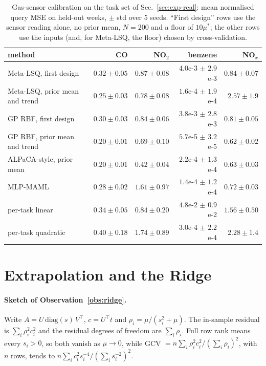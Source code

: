 \documentclass[fullpaper,final]{nldl}
\theoremstyle{plain}
\theoremstyle{definition}
\begin{document}
\begin{table}[tb]
\centering
\caption{Gas-sensor calibration on the task set of Sec.~\ref{sec:exp-real}: mean
normalised query MSE on held-out weeks, $\pm$ std over 5 seeds. ``First design''
rows use the sensor reading alone, no prior mean, $N{=}200$ and a floor of
$10\mu^\ast$; the
other rows use the inputs (and, for Meta-LSQ, the floor) chosen by cross-validation.}
\label{tab:realv2}
\footnotesize
\setlength{\tabcolsep}{5pt}
\begin{tabular}{lrrrr}
\toprule
method & CO & NO$_2$ & benzene & NO$_x$ \\
\midrule
Meta-LSQ, first design            & $0.32 \pm 0.05$ & $0.87 \pm 0.08$ & $4.0$e-3 $\pm$ $2.9$e-3 & $0.84 \pm 0.07$ \\
Meta-LSQ, prior mean and trend    & $0.25 \pm 0.03$ & $0.78 \pm 0.08$ & $1.6$e-4 $\pm$ $1.9$e-4 & $2.57 \pm 1.9$ \\
GP RBF, first design              & $0.30 \pm 0.03$ & $0.84 \pm 0.06$ & $3.8$e-3 $\pm$ $2.8$e-3 & $0.81 \pm 0.05$ \\
GP RBF, prior mean and trend      & $0.20 \pm 0.01$ & $0.69 \pm 0.10$ & $5.7$e-5 $\pm$ $3.2$e-5 & $0.62 \pm 0.02$ \\
ALPaCA-style, prior mean          & $0.20 \pm 0.01$ & $0.42 \pm 0.04$ & $2.2$e-4 $\pm$ $1.3$e-4 & $0.63 \pm 0.03$ \\
MLP-MAML                          & $0.28 \pm 0.02$ & $1.61 \pm 0.97$ & $1.4$e-4 $\pm$ $1.2$e-4 & $0.72 \pm 0.03$ \\
per-task linear                   & $0.34 \pm 0.05$ & $0.84 \pm 0.20$ & $4.8$e-2 $\pm$ $0.9$e-2 & $1.56 \pm 0.50$ \\
per-task quadratic                & $0.40 \pm 0.18$ & $1.74 \pm 0.89$ & $3.0$e-4 $\pm$ $2.2$e-4 & $2.28 \pm 1.4$ \\
\bottomrule
\end{tabular}
\end{table}

\section{Extrapolation and the Ridge}
\label{app:tail}

\paragraph{Sketch of Observation~\ref{obs:ridge}.} Write $A = U\,\mathrm{diag}(s)\,V^\top$,
$c = U^\top t$ and $\rho_i = \mu/(s_i^2+\mu)$. The in-sample residual is $\sum_i
\rho_i^2 c_i^2$ and the residual degrees of freedom are $\sum_i \rho_i$. Full row
rank means every $s_i > 0$, so both vanish as $\mu\to0$, while GCV $= n\sum_i
\rho_i^2 c_i^2/(\sum_i \rho_i)^2$, with $n$ rows, tends to $n\sum_i c_i^2
s_i^{-4}/(\sum_i s_i^{-2})^2$.
\end{document}
